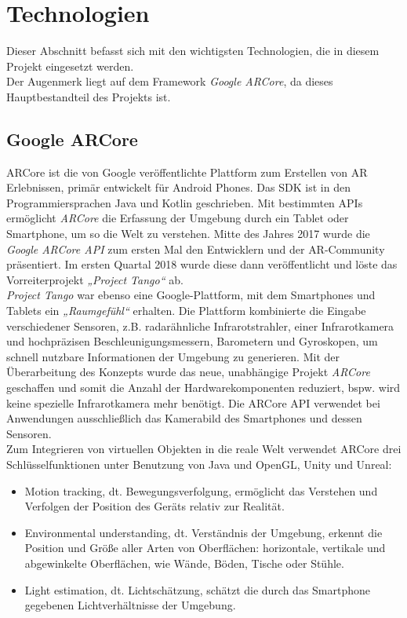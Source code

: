 \section{Technologien}
\label{chap:Technologien}                       %
Dieser Abschnitt befasst sich mit den wichtigsten Technologien, die in diesem Projekt eingesetzt werden. 
\\ 
Der Augenmerk liegt auf dem Framework \textit{Google ARCore}, da dieses Hauptbestandteil des Projekts ist. 
\subsection{Google ARCore}
\label{sec:arcore}
ARCore ist die von Google veröffentlichte Plattform zum Erstellen von \acl{AR} Erlebnissen, primär entwickelt für Android Phones. 
Das \ac{SDK} ist in den Programmiersprachen Java und Kotlin geschrieben. Mit bestimmten \acs{API}s ermöglicht \textit{ARCore} die Erfassung 
der Umgebung durch ein Tablet oder Smartphone, um so die Welt zu verstehen. Mitte des Jahres 2017 
wurde die \textit{Google ARCore API} zum ersten Mal den Entwicklern und der \acs{AR}-Community präsentiert. Im ersten Quartal 2018 wurde 
diese dann veröffentlicht und löste das Vorreiterprojekt \textit{„Project Tango“} ab. \cite{arcoreofficial.2020j}
\\ 
\linebreak 
\textit{Project Tango} war ebenso eine Google-Plattform, mit dem Smartphones und Tablets ein \textit{„Raumgefühl“} erhalten. \cite{projecttango.2016j} 
Die Plattform kombinierte die Eingabe verschiedener Sensoren, z.B. radarähnliche Infrarotstrahler, einer Infrarotkamera und hochpräzisen 
Beschleunigungsmessern, Barometern und Gyroskopen, um schnell nutzbare Informationen der Umgebung zu generieren. Mit der Überarbeitung des 
Konzepts wurde das neue, unabhängige Projekt \textit{ARCore} geschaffen und somit die Anzahl der Hardwarekomponenten reduziert, bspw. wird 
keine spezielle Infrarotkamera mehr benötigt. Die ARCore \acs{API} verwendet bei Anwendungen ausschließlich das Kamerabild des Smartphones und 
dessen Sensoren. 
\\ 
\linebreak 
Zum Integrieren von virtuellen Objekten in die reale Welt verwendet ARCore drei Schlüsselfunktionen unter Benutzung von Java und OpenGL, Unity 
und Unreal:
\begin{itemize}
    \item Motion tracking, dt. Bewegungsverfolgung, ermöglicht das Verstehen und Verfolgen der Position des Geräts relativ zur Realität.
    \item Environmental understanding, dt. Verständnis der Umgebung, erkennt die Position und Größe aller Arten von Oberflächen: horizontale, 
    vertikale und abgewinkelte Oberflächen, wie Wände, Böden, Tische oder Stühle.
    \item Light estimation, dt. Lichtschätzung, schätzt die durch das Smartphone gegebenen Lichtverhältnisse der Umgebung. \cite{arcorefundamentals.2018m}
\end{itemize}
